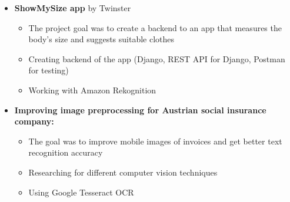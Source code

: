 \documentclass[10pt,a4paper,ragged2e,withhyper, normalphoto]{altacv}
\begin{document}
\begin{paracol}{2}
\begin{itemize}
        \item \textcolor{DarkPastelRed}{\textbf{ShowMySize app} by Twinster}
        \begin{itemize}
            \item The project goal was to create a backend to an app that measures the body's size and suggests suitable clothes
            \item Creating backend of the app (Django, REST API for Django, Postman for testing)
            \item Working with Amazon Rekognition
        \end{itemize}
        \item \textbf{\textcolor{DarkPastelRed}{Improving image preprocessing for Austrian social insurance company:}}
        \begin{itemize}
            \item The goal was to improve mobile images of invoices and get better text recognition accuracy 
            \item Researching for different computer vision techniques
            \item Using Google Tesseract OCR
        \end{itemize}
    \end{itemize}
    

\end{paracol}
\end{document}
